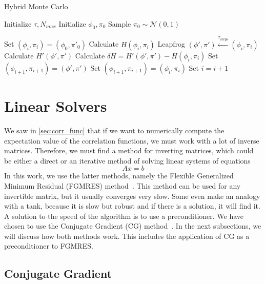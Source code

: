 \begin{algorithm}
    \caption{Hybrid Monte Carlo}
    \begin{algorithmic}[1]
        \State Initialize  $\tau, N_{max}$
        \State Initialize $\phi_0, \pi_0$
        \State Sample $\pi_0 \sim \mathcal{N}(0,1)$

        \State Set $(\phi_{i}, \pi_{i}) = (\phi_0, \pi'_0)$ 
          
            \State Calculate $H(\phi_{i}, \pi_{i})$
            \State Leapfrog $(\phi', \pi') \xleftarrow{\tau_\text{steps}} (\phi_{i}, \pi_{i})$ 
            \State Calculate $H'(\phi',\pi')$
            \State Calculate $\delta H = H'(\phi',\pi')-H(\phi_{i},\pi_{i})$
             
                \State Set $(\phi_{i+1}, \pi_{i+1}) = (\phi', \pi')$
                \Else
                \State Set $(\phi_{i+1}, \pi_{i+1}) = (\phi_{i}, \pi_{i})$
            \EndIf
        \State Set $i = i + 1$
        \EndWhile
    \end{algorithmic}
    \label{alg:hmc}
    \end{algorithm}

\section{Linear Solvers}

We saw in \cref{sec:corr_func} that if we want to numerically compute the expectation value of the correlation functions, we must work with a lot of inverse matrices. Therefore, we must find a method for inverting matrices, which could be either a direct or an iterative method of solving linear systems of equations
\begin{equation}
    Ax = b
    \label{eq:lineq}
\end{equation}
In this work, we use the latter methods, namely the Flexible Generalized Minimum Residual (FGMRES) method~\cite{fgmresart}. This method can be used for any invertible matrix, but it usually converges very slow. Some even make an analogy with a tank, because it is slow but robust and if there is a solution, it will find it. A solution to the speed of the algorithm is to use a preconditioner. We have chosen to use the Conjugate Gradient (CG) method~\cite{cgbook}. In the next subsections, we will discuss how both methods work. This includes the application of CG as a preconditioner to FGMRES.

\subsection{Conjugate Gradient}


